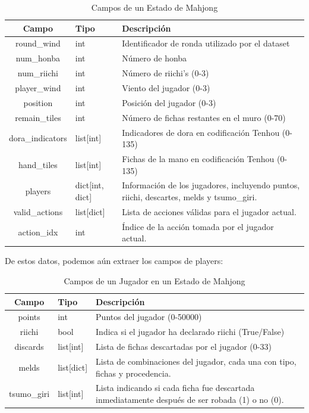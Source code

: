 \begin{table}[H]
  \centering
  \caption{Campos de un Estado de Mahjong}
  \label{tab:state_fields}
  \begin{tabular}{@{}clp{8cm}@{}}
    \toprule
    \textbf{Campo} & \textbf{Tipo} & \textbf{Descripción} \\
    \midrule
    round\_wind & int & Identificador de ronda utilizado por el dataset \\
    num\_honba & int & Número de honba \\
    num\_riichi & int & Número de riichi's (0-3) \\
    player\_wind & int & Viento del jugador (0-3) \\
    position & int & Posición del jugador (0-3) \\
    remain\_tiles & int & Número de fichas restantes en el muro (0-70) \\
    dora\_indicators & list[int] & Indicadores de dora en codificación Tenhou (0-135) \\
    hand\_tiles & list[int] & Fichas de la mano en codificación Tenhou (0-135) \\
    players & dict[int, dict] & Información de los jugadores, incluyendo puntos, riichi, descartes, melds y tsumo\_giri. \\
    valid\_actions & list[dict] & Lista de acciones válidas para el jugador actual. \\
    action\_idx & int & Índice de la acción tomada por el jugador actual. \\
    \bottomrule
  \end{tabular}
\end{table}

De estos datos, podemos aún extraer los campos de players:

\begin{table}[H]
  \centering
  \caption{Campos de un Jugador en un Estado de Mahjong}
  \label{tab:player_fields}
  \begin{tabular}{@{}clp{8cm}@{}}
    \toprule
    \textbf{Campo} & \textbf{Tipo} & \textbf{Descripción} \\
    \midrule
    points & int & Puntos del jugador (0-50000) \\
    riichi & bool & Indica si el jugador ha declarado riichi (True/False) \\
    discards & list[int] & Lista de fichas descartadas por el jugador (0-33) \\
    melds & list[dict] & Lista de combinaciones del jugador, cada una con tipo, fichas y procedencia. \\
    tsumo\_giri & list[int] & Lista indicando si cada ficha fue descartada inmediatamente después de ser robada (1) o no (0). \\
    \bottomrule
  \end{tabular}
\end{table}

